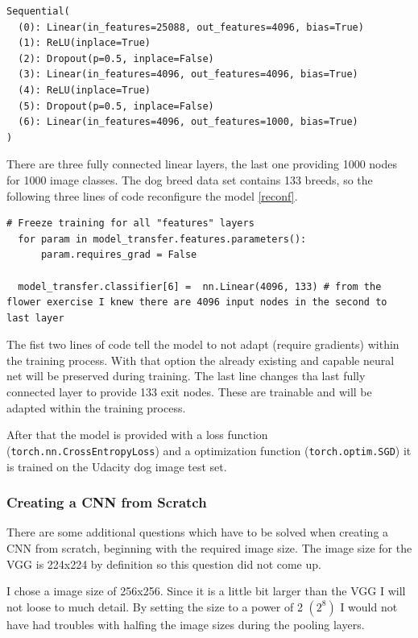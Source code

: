 \documentclass[paper=A4, DIV=calc, parskip=half]{scrartcl}
\begin{document}
\begin{lstlisting}[caption=Original VGG16 Classifier, label=orig_class]
Sequential(
  (0): Linear(in_features=25088, out_features=4096, bias=True)
  (1): ReLU(inplace=True)
  (2): Dropout(p=0.5, inplace=False)
  (3): Linear(in_features=4096, out_features=4096, bias=True)
  (4): ReLU(inplace=True)
  (5): Dropout(p=0.5, inplace=False)
  (6): Linear(in_features=4096, out_features=1000, bias=True)
)
\end{lstlisting}

There are three fully connected linear layers, the last one providing 1000 nodes
for 1000 image classes. The dog breed data set contains 133 breeds, so the
following three lines of code reconfigure the model \ref{reconf}.

\begin{lstlisting}[caption=Adapting VGG16 Classifier, label=reconf]
  # Freeze training for all "features" layers
  for param in model_transfer.features.parameters():
      param.requires_grad = False
  
  model_transfer.classifier[6] =  nn.Linear(4096, 133) # from the flower exercise I knew there are 4096 input nodes in the second to last layer
\end{lstlisting}

The fist two lines of code tell the model to not adapt (require gradients)
within the training process. With that option the already existing and capable
neural net will be preserved during training. The last line changes tha last
fully connected layer to provide 133 exit nodes. These are trainable and will be
adapted within the training process. 

After that the model is provided with a loss function
(\lstinline{torch.nn.CrossEntropyLoss}) and a optimization function
(\lstinline{torch.optim.SGD}) it is trained on the Udacity dog image test set.

\subsubsection*{Creating a CNN from Scratch}

There are some additional questions which have to be solved when creating a CNN
from scratch, beginning with the required image size. The image size for the VGG
is 224x224 by definition so this question did not come up.

I chose a image size of 256x256. Since it is a little bit larger than the VGG I
will not loose to much detail. By setting the size to a power of 2 $(2^8)$ I
would not have had troubles with halfing the image sizes during the pooling
layers.
\end{document}
